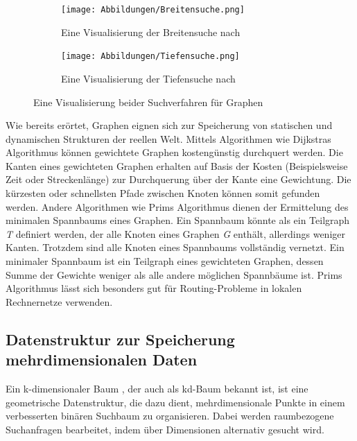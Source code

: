 \begin{figure}[t]
	\centering
	\begin{subfigure}[h]{0.49\textwidth}
		\texttt{[image: Abbildungen/Breitensuche.png]}
		\centering
		\caption[Breitensuche in Graphen]{Eine Visualisierung der Breitensuche nach \textcite[228]{knebl_algorithmen_2021}}
		\label{fig: breitensuche}
	\end{subfigure}
	\hfill
	\begin{subfigure}[h]{0.49\textwidth}
		\texttt{[image: Abbildungen/Tiefensuche.png]}
		\centering
		\caption[Tiefensuche in Graphen]{Eine Visualisierung der Tiefensuche nach \textcite[232]{knebl_algorithmen_2021}}
		\label{fig: tiefensuche}
	\end{subfigure}
	\caption[Suchverfahren von Graphen]{Eine Visualisierung beider Suchverfahren für Graphen}
	\label{fig: graph_search_functions}
\end{figure}

Wie bereits erörtet, Graphen eignen sich zur Speicherung von statischen und dynamischen Strukturen der reellen Welt. Mittels Algorithmen wie Dijkstras Algorithmus können gewichtete Graphen kostengünstig durchquert werden. Die Kanten eines gewichteten Graphen erhalten auf Basis der Kosten (Beispielsweise Zeit oder Streckenlänge) zur Durchquerung über der Kante eine Gewichtung. Die kürzesten oder schnellsten Pfade zwischen Knoten können somit gefunden werden. Andere Algorithmen wie Prims Algorithmus dienen der Ermittelung des minimalen Spannbaums eines Graphen. Ein Spannbaum könnte als ein Teilgraph \textit{T} definiert werden, der alle Knoten eines Graphen \textit{G} enthält, allerdings weniger Kanten. Trotzdem sind alle Knoten eines Spannbaums vollständig vernetzt. Ein minimaler Spannbaum ist ein Teilgraph eines gewichteten Graphen, dessen Summe der Gewichte weniger als alle andere möglichen Spannbäume ist. Prims Algorithmus lässt sich besonders gut für Routing-Probleme in lokalen Rechnernetze verwenden. \autocite[277-282]{hubwieser_fundamente_2015}

\subsection{Datenstruktur zur Speicherung mehrdimensionalen Daten}

Ein k-dimensionaler Baum , der auch als kd-Baum bekannt ist, ist eine geometrische Datenstruktur, die dazu dient, mehrdimensionale Punkte in einem verbesserten binären Suchbaum zu organisieren. Dabei werden raumbezogene Suchanfragen bearbeitet, indem über Dimensionen alternativ gesucht wird. \autocite[92]{saha_advanced_2019} \autocite{bentley_fast_1978}

